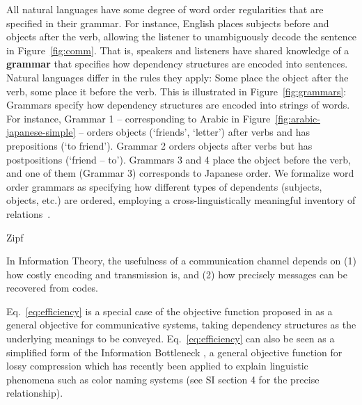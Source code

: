 \documentclass[9pt,twocolumn,twoside,lineno]{pnas-new}
\newcommand{\key}[1]{\textbf{#1}}
\begin{document}


All natural languages have some degree of word order regularities that are specified in their grammar.
For instance, English places subjects before and objects after the verb, allowing the listener to unambiguously decode the sentence in Figure~\ref{fig:comm}.
That is, speakers and listeners have shared knowledge of a \key{grammar} that specifies how dependency structures are encoded into sentences.
Natural languages differ in the rules they apply: Some place the object after the verb, some place it before the verb.
This is illustrated in Figure~\ref{fig:grammars}: Grammars specify how dependency structures are encoded into strings of words.
For instance, Grammar 1 -- corresponding to Arabic in Figure~\ref{fig:arabic-japanese-simple} -- orders objects (`friends', `letter') after verbs and has prepositions (`to friend').
Grammar 2 orders objects after verbs but has postpositions (`friend -- to').
Grammars 3 and 4 place the object before the verb, and one of them (Grammar 3) corresponds to Japanese order.
We formalize word order grammars as specifying how different types of dependents (subjects, objects, etc.) are ordered, employing a cross-linguistically meaningful inventory of relations~\cite{nivre2015universal}.

Zipf

In Information Theory, the usefulness of a communication channel depends on (1) how costly encoding and transmission is, and (2) how precisely messages can be recovered from codes.



Eq.~\ref{eq:efficiency} is a special case of the objective function proposed in \cite{ferrericancho2002zipf,ferrericancho2007global,futrell2017memory} as a general objective for communicative systems, taking dependency structures as the underlying meanings to be conveyed.
Eq.~\ref{eq:efficiency} can also be seen as a simplified form of the Information Bottleneck \cite{tishby1999information}, a general objective function for lossy compression which has recently been applied to explain linguistic phenomena such as color naming systems \cite{zaslavsky2018efficient} (see SI section 4 for the precise relationship). 
\end{document}
